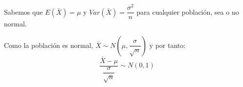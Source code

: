 


Sabemos que $E(\bar{X})=\mu$ y $Var(\bar{X})=\dfrac{\sigma^2}{n}$ para cualquier poblaci\'on, sea o no normal.

Como la poblaci\'on es normal, $\bar{X}\sim N(\mu,\dfrac{\sigma}{\sqrt{n}})$ y por tanto:
\begin{equation*}
\dfrac{\bar{X}-\mu}{\dfrac{\sigma}{\sqrt{n}}}\sim N(0,1)
\end{equation*}
